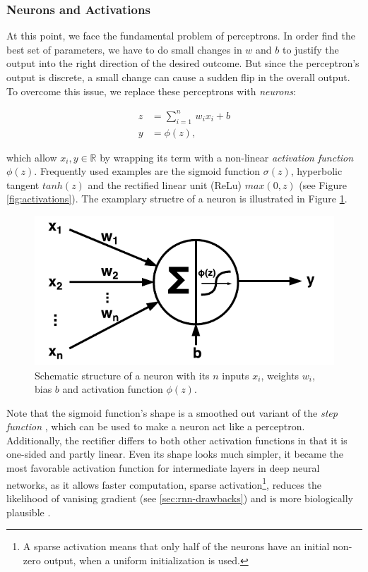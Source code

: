 \subsubsection{Neurons and Activations}

At this point, we face the fundamental problem of perceptrons. In order find the best set of parameters, we have to do small changes in $ w $ and $ b $ to justify the output into the right direction of the desired outcome. But since the perceptron's output is discrete, a small change can cause a sudden flip in the overall output. To overcome this issue, we replace these perceptrons with \textit{neurons}:

\begin{equation}
\begin{aligned}
z &= \sum\limits_{i=1}^n \, w_{i}x_{i} + b \\
y &= \phi(z) ,
\end{aligned}
\end{equation}

which allow $ x_{i}, y \in \mathbb{R} $ by wrapping its term with a non-linear \textit{activation function} $ \phi(z) $. Frequently used examples are the sigmoid function $ \sigma(z) $, hyperbolic tangent $ tanh(z) $ and the rectified linear unit (ReLu) $ max(0, z) $ (see Figure \ref{fig:activations}). The examplary structre of a neuron is illustrated in Figure \ref{fig:neuron}.

\begin{figure}[htpb]
	\centering
	\includegraphics[scale=0.6]{figures/neuron.pdf}
	\caption[Schematic neuron]{Schematic structure of a neuron with its $ n $ inputs $x_{i}$, weights $w_{i}$, bias $ b $ and activation function $\phi(z)$.} \label{fig:neuron}
\end{figure}

Note that the sigmoid function's shape is a smoothed out variant of the \textit{step function} \parencite{neural_nets_deep_learning}, which can be used to make a neuron act like a perceptron. Additionally, the rectifier differs to both other activation functions in that it is one-sided and partly linear. Even its shape looks much simpler, it became the most favorable activation function for intermediate layers in deep neural networks, as it allows faster computation, sparse activation\footnote{{A sparse activation means that only half of the neurons have an initial non-zero output, when a uniform initialization is used.}}, reduces the likelihood of vanising gradient (see \ref{sec:rnn-drawbacks}) and is more biologically plausible \parencite{relu}.

